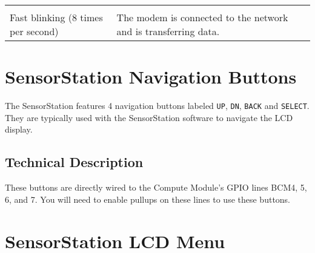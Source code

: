 \documentclass[
]{article}
\begin{document}
\begin{longtable}[]{@{}lll@{}}
\begin{minipage}[t]{0.32\columnwidth}
\end{minipage} & \begin{minipage}[t]{0.33\columnwidth}\raggedright
\strut
\end{minipage}\tabularnewline
\begin{minipage}[t]{0.26\columnwidth}\raggedright
Fast blinking (8 times per second)\strut
\end{minipage} & \begin{minipage}[t]{0.32\columnwidth}\raggedright
The modem is connected to the network and is transferring data.\strut
\end{minipage} & \begin{minipage}[t]{0.33\columnwidth}\raggedright
\strut
\end{minipage}\tabularnewline
\bottomrule
\end{longtable}

\hypertarget{sensorstation-navigation-buttons}{%
\section{SensorStation Navigation
Buttons}\label{sensorstation-navigation-buttons}}

The SensorStation features 4 navigation buttons labeled \texttt{UP},
\texttt{DN}, \texttt{BACK} and \texttt{SELECT}. They are typically used
with the SensorStation software to navigate the LCD display.

\hypertarget{technical-description}{%
\subsection{Technical Description}\label{technical-description}}

These buttons are directly wired to the Compute Module's GPIO lines
BCM4, 5, 6, and 7. You will need to enable pullups on these lines to use
these buttons.

\hypertarget{sensorstation-lcd-menu}{%
\section{SensorStation LCD Menu}\label{sensorstation-lcd-menu}}
\end{document}
